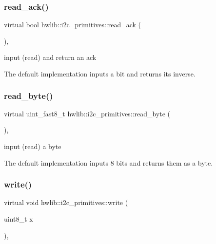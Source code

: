 \subsubsection{\texorpdfstring{read\+\_\+ack()}{read\_ack()}}
{\footnotesize\ttfamily virtual bool hwlib\+::i2c\+\_\+primitives\+::read\+\_\+ack (\begin{DoxyParamCaption}{ }\end{DoxyParamCaption})\hspace{0.3cm}{\ttfamily [inline]}, {\ttfamily [virtual]}}

input (read) and return an ack

The default implementation inputs a bit and returns its inverse. \mbox{\label{classhwlib_1_1i2c__primitives_a21c9843d3a7801781e576013a1e154f9}} 
\subsubsection{\texorpdfstring{read\+\_\+byte()}{read\_byte()}}
{\footnotesize\ttfamily virtual uint\+\_\+fast8\+\_\+t hwlib\+::i2c\+\_\+primitives\+::read\+\_\+byte (\begin{DoxyParamCaption}{ }\end{DoxyParamCaption})\hspace{0.3cm}{\ttfamily [inline]}, {\ttfamily [virtual]}}

input (read) a byte

The default implementation inputs 8 bits and returns them as a byte. \mbox{\label{classhwlib_1_1i2c__primitives_aa5227ae39d6dd5957cf47b0b761b475b}} 
\subsubsection{\texorpdfstring{write()}{write()}\hspace{0.1cm}{\footnotesize\ttfamily [1/2]}}
{\footnotesize\ttfamily virtual void hwlib\+::i2c\+\_\+primitives\+::write (\begin{DoxyParamCaption}\item[{uint8\+\_\+t}]{x }\end{DoxyParamCaption})\hspace{0.3cm}{\ttfamily [inline]}, {\ttfamily [virtual]}}


